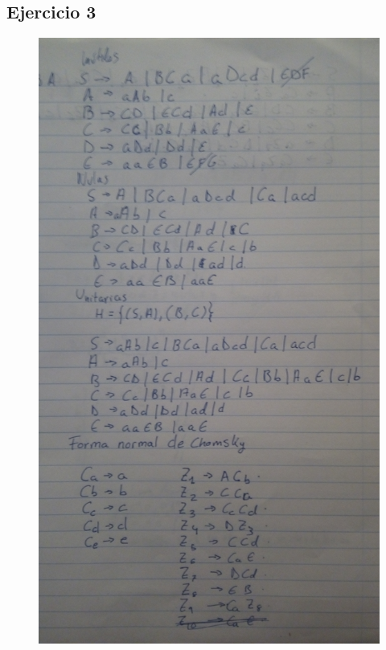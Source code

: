 \documentclass{article}
\begin{document}
\subsection{Ejercicio 3}
  \begin{figure}[H]
    \centering
    \includegraphics[scale=0.1]{fotos/chomsky1.jpg}
  \end{figure}
\end{document}
